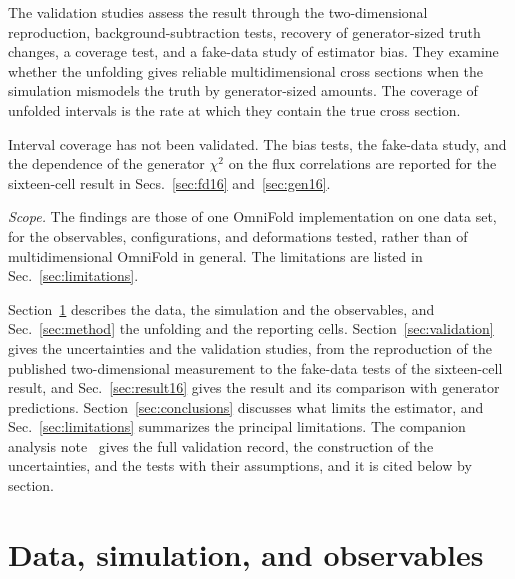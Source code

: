 The validation studies assess the result through the two-dimensional reproduction, background-subtraction tests,
recovery of generator-sized truth changes, a coverage test, and a fake-data study of estimator bias.
They examine whether the unfolding gives reliable multidimensional cross sections when the simulation mismodels the
truth by generator-sized amounts.
The coverage of unfolded intervals is the rate at which they contain the true cross section.

Interval coverage has not been validated.
The bias tests, the fake-data study, and the dependence of the generator $\chi^{2}$ on the flux correlations are
reported for the sixteen-cell result in Secs.~\ref{sec:fd16} and~\ref{sec:gen16}.

\emph{Scope.} The findings are those of one OmniFold implementation on one data set, for the observables,
configurations, and deformations tested, rather than of multidimensional OmniFold in general.
The limitations are listed in Sec.~\ref{sec:limitations}.

Section~\ref{sec:data} describes the data, the simulation and the observables, and Sec.~\ref{sec:method} the
unfolding and the reporting cells.
Section~\ref{sec:validation} gives the uncertainties and the validation studies, from the reproduction of the
published two-dimensional measurement to the fake-data tests of the sixteen-cell result, and
Sec.~\ref{sec:result16} gives the result and its comparison with generator predictions.
Section~\ref{sec:conclusions} discusses what limits the estimator, and Sec.~\ref{sec:limitations} summarizes the
principal limitations.
The companion analysis note~\cite{AnalysisNote2026} gives the full validation record, the construction of the
uncertainties, and the tests with their assumptions, and it is cited below by section.

\section{Data, simulation, and observables}
\label{sec:data}


